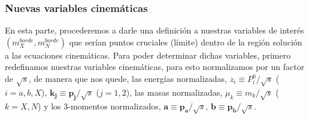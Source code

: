 \subsubsection{Nuevas variables cinemáticas}

En esta parte, procederemos a darle una definición a nuestras variables de interés \((m^{borde}_{X}, m^{borde}_{N})\) que serían puntos cruciales (límite) dentro de la región solución a las ecuaciones cinemáticas. Para poder determinar dichas variables, primero redefinamos nuestras variables cinemáticas, para esto normalizamos por un factor de \(\sqrt{s}\), de manera que nos quede, las energías normalizadas, \(z_{i}\equiv P^{0}_{i}/\sqrt{s}\) (\(i=a,b,X\)), \(\mathbf{k_{j}}\equiv \mathbf{p_{j}}/\sqrt{s}\) (\(j=1,2\)), las masas normalizadas, \(\mu_{k}\equiv m_{k}/\sqrt{s}\) (\(k=X,N\)) y los 3-momentos normalizados, \(\mathbf{a}\equiv \mathbf{p_{a}}/\sqrt{s}\), \(\mathbf{b} \equiv \mathbf{p_b}/\sqrt{s}\).

